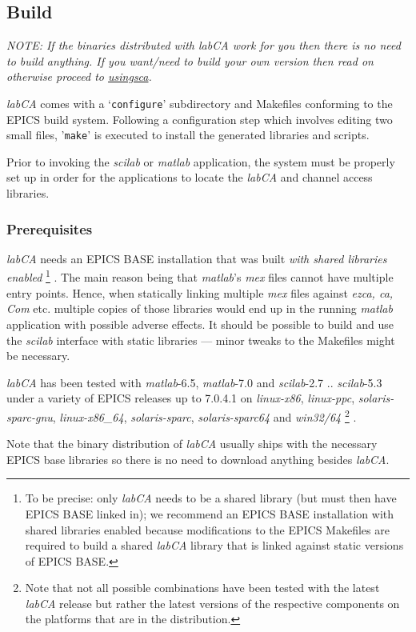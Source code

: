 \documentclass{article}
\newcommand{\sca}{\ita{labCA}}
\newcommand{\scilab}{\ita{scilab}}
\newcommand{\matlab}{\ita{matlab}}
\newcommand{\windoze}{\ita{win32/64}}
\newcommand{\com}[1]{{\tt #1}}
\newcommand{\ita}[1]{\emph{#1}}
\begin{document}
\subsection{Build}
{\em NOTE: If the binaries distributed with \sca{} work for you then there is
no need to build anything. If you want/need to build your own version then read on
otherwise proceed to \hyperref{Using \sca}{Subsection~}{}{usingsca}.}

\sca{} comes with a `\com{configure}' subdirectory and Makefiles conforming to the
EPICS build system. Following a configuration step which involves editing
two small files, '\com{make}' is executed to install the generated libraries
and scripts.

Prior to invoking the \scilab{} or \matlab{} application, the system
must be properly set up in order for the applications to locate the
\sca{} and channel access libraries.

\subsubsection{Prerequisites}
\sca{} needs an EPICS BASE installation that was built \ita{with shared
libraries enabled}%
\footnote{
To be precise: only \sca{} needs to be a shared library (but must then have
EPICS BASE linked in); we recommend an EPICS BASE installation with
shared libraries enabled because modifications to the EPICS Makefiles
are required to build a shared \sca{} library that is linked against
static versions of EPICS BASE.}%
.
The main reason being that \matlab's \ita{mex} files cannot
have multiple entry points. Hence, when statically linking multiple \ita{mex}
files against \ita{ezca, ca, Com} etc. multiple copies of those libraries
would end up in the running \matlab{} application with possible adverse
effects. It should be possible to build and use the \scilab{} interface
with static libraries --- minor tweaks to the Makefiles might be necessary.

\sca{} has been tested with \matlab-6.5, \matlab-7.0 and \scilab-2.7 .. \scilab-5.3
under a variety of EPICS releases up to 7.0.4.1 on \ita{linux-x86},
\ita{linux-ppc}, \ita{solaris-sparc-gnu},
\ita{linux-x86\_64}, \ita{solaris-sparc}, \ita{solaris-sparc64}
and \windoze%
\footnote{
Note that not all possible combinations have been tested with the latest \sca{} release
but rather the latest versions of the respective components on the platforms
that are in the distribution.}%
.

Note that the binary distribution of \sca{} usually ships with the
necessary EPICS base libraries so there is no need to download anything
besides \sca.
\end{document}
